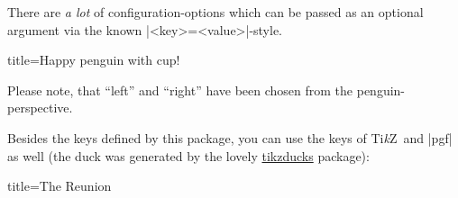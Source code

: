 \documentclass[parskip=half,english,numbers=noenddot,footnotes=nomultiple,oneside]{scrartcl}
\let\say\enquote
\def\TikZ{Ti\textit{k}Z}
\begin{document}
There are \textit{a lot} of configuration-options which can be passed as an optional argument via the known |<key>=<value>|-style.
\begin{tcblisting}{title={Happy penguin with cup!}}
\end{tcblisting}
Please note, that \say{left} and \say{right} have been chosen from the penguin-perspective.

Besides the keys defined by this package, you can use the keys of \TikZ\ and |pgf| as well (the duck was generated by the lovely \href{https://github.com/samcarter/tikzducks}{tikzducks} package):
\begin{tcblisting}{title={The Reunion}}
\begin{tikzpicture}
	\duck
	\pingu[xshift=2.8cm, yshift=14mm,
	       eyes wink]
\end{tikzpicture}
\end{tcblisting}
\end{document}
